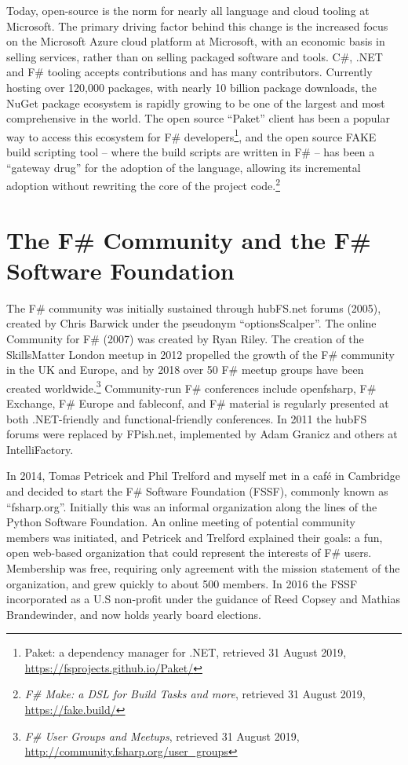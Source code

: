 \documentclass[acmsmall]{acmart}\settopmatter{}
\begin{document}
Today, open-source is the norm for nearly all language and cloud tooling at Microsoft. The primary driving factor
behind this change is the increased focus on the Microsoft Azure cloud platform at Microsoft, with an economic basis in
selling services, rather than on selling packaged software and tools. C\#, .NET and F\# tooling accepts contributions and
has many contributors. Currently hosting over 120,000 packages, with nearly 10 billion package downloads, the NuGet
package ecosystem is rapidly growing to be one of the largest and most comprehensive in the world.  The open source ``Paket''
client has been a popular way to access this ecosystem for F\#
developers\footnote{Paket: a dependency manager for .NET, retrieved 31 August 2019, \url{https://fsprojects.github.io/Paket/}}, and
the open source FAKE build scripting tool – where the build scripts are written in F\# – has been a “gateway drug” for the adoption of the language, allowing its
incremental adoption without rewriting the core of the project code.\footnote{\textit{F\# Make: a DSL for Build Tasks and more}, retrieved 31 August 2019, \url{https://fake.build/}}



\section*{The F\# Community and the F\# Software Foundation }

The F\# community was initially sustained through hubFS.net forums (2005), created by Chris Barwick under the
pseudonym “optionsScalper”. The online Community for F\# (2007) was created by Ryan Riley.  The creation of the
SkillsMatter London meetup in 2012 propelled the growth of the F\# community in the UK and Europe, and by 2018
over 50 F\# meetup groups have been created worldwide.\footnote{ \textit{F\# User Groups and Meetups}, retrieved 31 August 2019, \url{http://community.fsharp.org/user_groups}}
Community-run F\# conferences include openfsharp, F\# Exchange, F\# Europe and fableconf, and F\# material is regularly presented at both .NET-friendly and functional-friendly conferences. In 2011 the hubFS forums were replaced by FPish.net, implemented by Adam Granicz and others at IntelliFactory. 

In 2014, Tomas Petricek and Phil Trelford and myself met in a café in Cambridge and decided to start the F\# Software
Foundation (FSSF), commonly known as “fsharp.org”.  Initially this was an informal organization along the lines of the Python
Software Foundation.  An online meeting of potential community members was initiated, and Petricek and Trelford explained
their goals: a fun, open web-based organization that could represent the interests of F\# users.  Membership was free,
requiring only agreement with the mission statement of the organization, and grew quickly to about 500 members.  In 2016 the
FSSF incorporated as a U.S non-profit under the guidance of Reed Copsey and Mathias Brandewinder, and now holds yearly board elections. 
\end{document}
